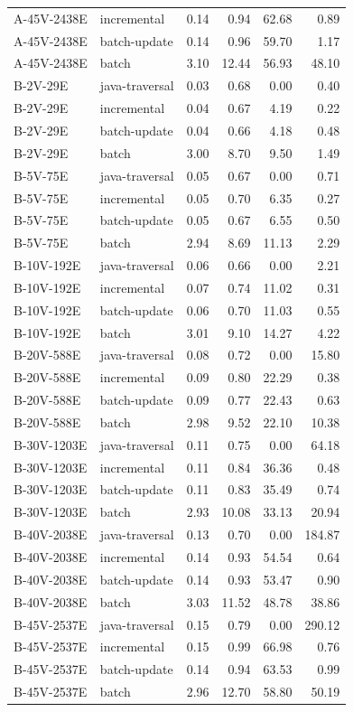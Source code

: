 \begin{tabular}{@{}llrrrr@{}}
A-45V-2438E & incremental & 0.14 & 0.94 & 62.68 & 0.89 \\
A-45V-2438E & batch-update & 0.14 & 0.96 & 59.70 & 1.17 \\
A-45V-2438E & batch & 3.10 & 12.44 & 56.93 & 48.10 \\
B-2V-29E & java-traversal & 0.03 & 0.68 & 0.00 & 0.40 \\
B-2V-29E & incremental & 0.04 & 0.67 & 4.19 & 0.22 \\
B-2V-29E & batch-update & 0.04 & 0.66 & 4.18 & 0.48 \\
B-2V-29E & batch & 3.00 & 8.70 & 9.50 & 1.49 \\
B-5V-75E & java-traversal & 0.05 & 0.67 & 0.00 & 0.71 \\
B-5V-75E & incremental & 0.05 & 0.70 & 6.35 & 0.27 \\
B-5V-75E & batch-update & 0.05 & 0.67 & 6.55 & 0.50 \\
B-5V-75E & batch & 2.94 & 8.69 & 11.13 & 2.29 \\
B-10V-192E & java-traversal & 0.06 & 0.66 & 0.00 & 2.21 \\
B-10V-192E & incremental & 0.07 & 0.74 & 11.02 & 0.31 \\
B-10V-192E & batch-update & 0.06 & 0.70 & 11.03 & 0.55 \\
B-10V-192E & batch & 3.01 & 9.10 & 14.27 & 4.22 \\
B-20V-588E & java-traversal & 0.08 & 0.72 & 0.00 & 15.80 \\
B-20V-588E & incremental & 0.09 & 0.80 & 22.29 & 0.38 \\
B-20V-588E & batch-update & 0.09 & 0.77 & 22.43 & 0.63 \\
B-20V-588E & batch & 2.98 & 9.52 & 22.10 & 10.38 \\
B-30V-1203E & java-traversal & 0.11 & 0.75 & 0.00 & 64.18 \\
B-30V-1203E & incremental & 0.11 & 0.84 & 36.36 & 0.48 \\
B-30V-1203E & batch-update & 0.11 & 0.83 & 35.49 & 0.74 \\
B-30V-1203E & batch & 2.93 & 10.08 & 33.13 & 20.94 \\
B-40V-2038E & java-traversal & 0.13 & 0.70 & 0.00 & 184.87 \\
B-40V-2038E & incremental & 0.14 & 0.93 & 54.54 & 0.64 \\
B-40V-2038E & batch-update & 0.14 & 0.93 & 53.47 & 0.90 \\
B-40V-2038E & batch & 3.03 & 11.52 & 48.78 & 38.86 \\
B-45V-2537E & java-traversal & 0.15 & 0.79 & 0.00 & 290.12 \\
B-45V-2537E & incremental & 0.15 & 0.99 & 66.98 & 0.76 \\
B-45V-2537E & batch-update & 0.14 & 0.94 & 63.53 & 0.99 \\
B-45V-2537E & batch & 2.96 & 12.70 & 58.80 & 50.19 \\
\bottomrule
\end{tabular}
